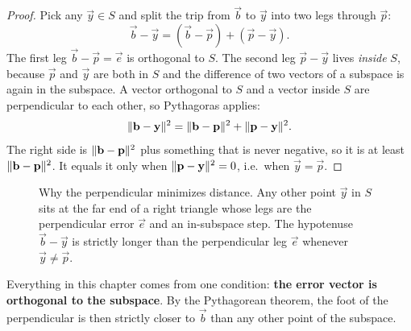 \begin{proof}
Pick any $\vec{y}\in S$ and split the trip from $\vec{b}$ to $\vec{y}$ into two legs through
$\vec{p}$:
\[
  \vec{b}-\vec{y} = (\vec{b}-\vec{p}) + (\vec{p}-\vec{y}).
\]
The first leg $\vec{b}-\vec{p}=\vec{e}$ is orthogonal to $S$. The second leg $\vec{p}-\vec{y}$
lives \emph{inside} $S$, because $\vec{p}$ and $\vec{y}$ are both in $S$ and the difference of two
vectors of a subspace is again in the subspace. A vector orthogonal to $S$ and a vector inside $S$
are perpendicular to each other, so Pythagoras applies:
\[
  \lVert\mathbf{b}-\mathbf{y}\rVert^2 = \lVert\mathbf{b}-\mathbf{p}\rVert^2 + \lVert\mathbf{p}-\mathbf{y}\rVert^2.
\]
The right side is $\lVert\mathbf{b}-\mathbf{p}\rVert^2$ plus something that is never negative, so it is at
least $\lVert\mathbf{b}-\mathbf{p}\rVert^2$. It equals it only when $\lVert\mathbf{p}-\mathbf{y}\rVert^2=0$, i.e.\ when
$\vec{y}=\vec{p}$.
\end{proof}

\begin{figure}[H]
\centering
{}
\caption{Why the perpendicular minimizes distance. Any other point $\vec{y}$ in $S$ sits at the far end of a
right triangle whose legs are the perpendicular error $\vec{e}$ and an in-subspace step. The
hypotenuse $\vec{b}-\vec{y}$ is strictly longer than the perpendicular leg $\vec{e}$ whenever $\vec{y}\neq\vec{p}$.}
\label{ch18:pythagoras}
\end{figure}

\begin{focusbox}
Everything in this chapter comes from one condition:
\textbf{the error vector is orthogonal to the subspace}. By the Pythagorean
theorem, the foot of the perpendicular is then strictly closer to $\vec{b}$
than any other point of the subspace.
\end{focusbox}

